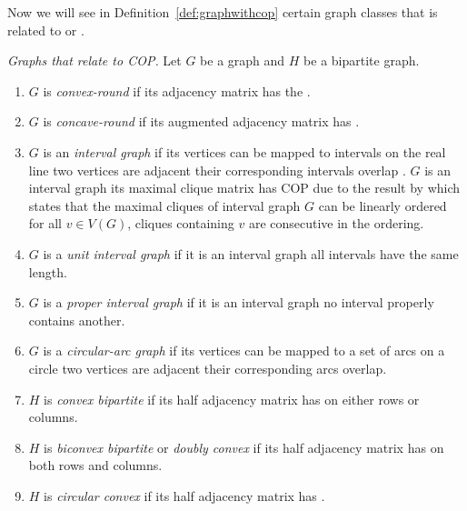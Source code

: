 Now we will see in Definition~\ref{def:graphwithcop} certain graph
classes that is related to \COP or \CROP.\\

\begin{definition}{\emph{Graphs that relate to
      COP.\cite[Def.~2.5]{d08phd}}} %
   \label{def:graphwithcop} %
   Let $G$ be a graph and $H$ be a bipartite graph.

   \begin{enumerate}
   \item $G$ is \emph{convex-round} if its adjacency matrix has the
     \CROP.
   \item $G$ is \emph{concave-round} if its augmented adjacency matrix
     has \CROP.  
   \item $G$ is an \emph{interval graph} if its vertices can be mapped
     to intervals on the real line \stt two vertices are adjacent \iff
     their corresponding intervals overlap .
     $G$ is an interval graph \iff its maximal clique matrix has COP
     due to the result by \cite{gh64} which states that the maximal
     cliques of interval graph $G$ can be linearly ordered \stt for
     all $v \in V(G)$, cliques containing $v$ are consecutive in the
     ordering.
   \item $G$ is a \emph{unit interval graph} if it is an interval
     graph \stt all intervals have the same length.
   \item $G$ is a \emph{proper interval graph} if it is an interval
     graph \stt no interval properly contains another.
   \item $G$ is a \emph{circular-arc graph} if its vertices can be
     mapped to a set of arcs on a circle \stt two vertices are
     adjacent \iff their corresponding arcs overlap.
   \item $H$ is \emph{convex bipartite} if its half adjacency matrix
     has \COP on either rows or columns.
   \item $H$ is \emph{biconvex bipartite} or \emph{doubly
       convex}\cite{yc95} if its half adjacency matrix has \COP on
     both rows and columns.
   \item $H$ is \emph{circular convex} if its half adjacency matrix
     has \CROP.
   \end{enumerate}
\end{definition}

